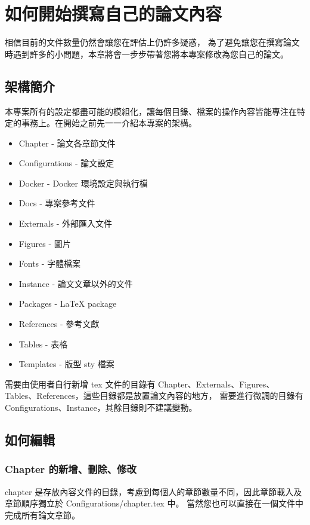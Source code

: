 \chapter{如何開始撰寫自己的論文內容} \label{ch_how2start}

相信目前的文件數量仍然會讓您在評估上仍許多疑惑，
為了避免讓您在撰寫論文時遇到許多的小問題，本章將會一步步帶著您將本專案修改為您自己的論文。

\section{架構簡介}

本專案所有的設定都盡可能的模組化，讓每個目錄、檔案的操作內容皆能專注在特定的事務上。在開始之前先一一介紹本專案的架構。

\begin{itemize}
    \item Chapter - 論文各章節文件
    \item Configurations - 論文設定
    \item Docker - Docker 環境設定與執行檔
    \item Docs - 專案參考文件
    \item Externals - 外部匯入文件
    \item Figures - 圖片
    \item Fonts - 字體檔案
    \item Instance - 論文文章以外的文件
    \item Packages - LaTeX package
    \item References - 參考文獻
    \item Tables - 表格
    \item Templates - 版型 sty 檔案
\end{itemize}

需要由使用者自行新增 tex 文件的目錄有 Chapter、Externals、Figures、Tables、References，這些目錄都是放置論文內容的地方，
需要進行微調的目錄有 Configurations、Instance，其餘目錄則不建議變動。

\section{如何編輯}

\subsection*{Chapter 的新增、刪除、修改}

chapter 是存放內容文件的目錄，考慮到每個人的章節數量不同，因此章節載入及章節順序獨立於 Configurations/chapter.tex 中。
當然您也可以直接在一個文件中完成所有論文章節。

